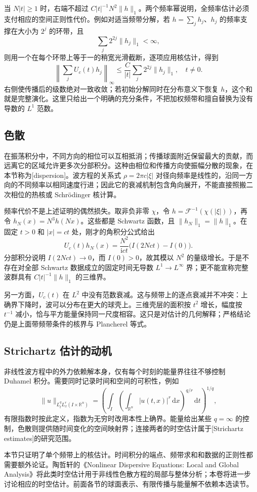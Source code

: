 当 \(N|t|\geq1\) 时，右端不超过 \(C|t|^{-1}N^2\|h\|_1\)。两个频率幂说明，全频率估计必须支付相应的空间正则性代价。例如对适当频带分解，若 \(h=\sum_jh_j\)、\(h_j\) 的频率支撑在大小为 \(2^j\) 的环带，且
\[
 \sum_j2^{2j}\|h_j\|_1<\infty,
\]
则用一个在每个环带上等于一的稍宽光滑截断，逐项应用核估计，得到
\[
 \left\|\sum_jU_c(t)h_j\right\|_\infty
 \leq\dfrac C{|t|}\sum_j2^{2j}\|h_j\|_1,\quad t\ne0.
\]
右侧使传播后的级数绝对一致收敛；若初始分解同时在分布意义下恢复 \(h\)，这个和就是完整演化。这里只给出一个明确的充分条件，不把加权频带和擅自替换为没有导数的 \(L^1\) 范数。

\subsection{色散}
\label{b2:subsec:110402}

在振荡积分中，不同方向的相位可以互相抵消；传播球面附近保留最大的贡献，而远离它的区域允许更多次分部积分。这种由相位和传播方向使振幅分散的现象，在本节称为[dispersion]。波方程的关系式 \(\rho=2\pi c|\xi|\) 对径向频率是线性的，沿同一方向的不同频率以相同速度行进；因此它的衰减机制包含角向展开，不能直接照搬二次相位的热核或 Schrödinger 核计算。

\ProseParagraphBreak

频率代价不是上述证明的偶然损失。取非负非零 \(\chi\)，令 \(h=\mathcal F^{-1}(\chi(|\xi|))\)，再令 \(h_N(x)=N^3h(Nx)\)。这些都是 Schwartz 函数，且 \(\|h_N\|_1=\|h\|_1\)。在固定 \(t>0\) 和 \(|x|=ct\) 处，刚才的角积分公式给出
\[
 U_c(t)h_N(x)=\dfrac{N^2}{\mathrm{i}ct}
                    \bigl(I(2Nct)-I(0)\bigr).
\]
分部积分说明 \(I(2Nct)\to0\)，而 \(I(0)>0\)，故其模以 \(N^2\) 的量级增长。于是不存在对全部 Schwartz 数据成立的固定时间无导数 \(L^1\to L^\infty\) 界；更不能宣称完整波群具有 \(C|t|^{-1}\|h\|_1\) 的三维界。

\ProseParagraphBreak

另一方面，\(U_c(t)\) 在 \(L^2\) 中没有范数衰减。这与频带上的逐点衰减并不冲突：上确界下降时，波可以分布在更大的球壳上。三维壳层的面积按 \(t^2\) 增长，幅度按 \(t^{-1}\) 减小，恰与平方能量保持同一尺度相容。这只是对估计的几何解释；严格结论仍是上面带频带条件的核界与 Plancherel 等式。

\subsection{Strichartz 估计的动机}
\label{b2:subsec:110403}

非线性波方程中的外力依赖解本身，仅有每个时刻的能量界往往不够控制 Duhamel 积分。需要同时记录时间和空间的可积性，例如
\[
 \|u\|_{L^q_tL^r_x(I\times\mathbb R^n)}
 =\left(\int_I\left(\int_{\mathbb R^n}|u(t,x)|^r\,\mathrm{d}x\right)^{q/r}
 \,\mathrm{d}t\right)^{1/q},
\]
有限指数时按此定义，指数为无穷时改用本性上确界。能量给出某些 \(q=\infty\) 的控制，色散则提供随时间变化的空间映射界；连接两者的时空估计属于[Strichartz estimates]的研究范围。

\ProseParagraphBreak

本节只证明了单个频带上的核估计。时间积分的端点、频带求和和数据的正则性都需要额外论证。陶哲轩的《Nonlinear Dispersive Equations: Local and Global Analysis》\cite{Tao2006Nonlinear}将此类时空估计用于非线性色散方程的局部与整体分析；本卷将进一步讨论相应的时空估计。前面各节的球面表示、有限传播与能量解不依赖本选读节。

